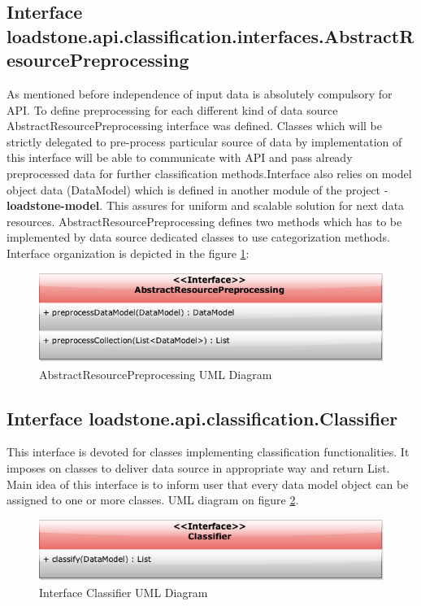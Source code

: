 \subsection{Interface \newline loadstone.api.classification.interfaces.\newline AbstractResourcePreprocessing}
As mentioned before independence of input data is absolutely compulsory for API. To define preprocessing for each different kind of data source  AbstractResourcePreprocessing interface was defined. Classes which will be strictly delegated to pre-process particular source of data by implementation of this interface will be able to communicate with API and pass already preprocessed data for further classification methods.Interface also relies on model object data (DataModel) which is defined in another module of the project - \textbf{loadstone-model}. This assures for uniform and scalable solution for next data resources. AbstractResourcePreprocessing defines two methods which has to be implemented by data source dedicated classes to use categorization methods. Interface organization is depicted in the figure \ref{fig:@=AbstractResourcePreprocessing}:
\begin{figure}[h]
	\centering
	\includegraphics[scale=0.5]{AbstractResourcePreprocessing.png}
	\caption{AbstractResourcePreprocessing UML Diagram}
	\label{fig:@=AbstractResourcePreprocessing}
\end{figure}
\subsection{Interface \newline loadstone.api.classification.Classifier}
This interface is devoted for classes implementing classification functionalities. It imposes on classes to deliver data source in appropriate way and return List. Main idea of this interface is to inform user that every data model object can be assigned to one or more classes. UML diagram on figure \ref{fig:@=classifier}.
\begin{figure}[h]
	\centering
	\includegraphics[scale=0.5]{classifier_interface.png}
	\caption{Interface Classifier UML Diagram}
	\label{fig:@=classifier}
\end{figure}
